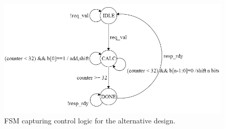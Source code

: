 \documentclass[10pt]{article}
\begin{document}
\begin{figure}[b]
\centering
\includegraphics[scale=0.6]{AltFSM}
\caption{FSM capturing control logic for the alternative design.}
\label{fig:AltFSM}
\end{figure}
\end{document}
